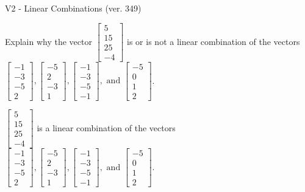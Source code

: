 \begin{exercise}
  \begin{exerciseTitle}V2 - Linear Combinations (ver. 349)\end{exerciseTitle}
  \begin{exerciseStatement}
    Explain why the vector \(\left[\begin{array}{c}
5 \\
15 \\
25 \\
-4
\end{array}\right]\)  is or is not a linear 
	combination of the vectors \(\left[\begin{array}{c}
-1 \\
-3 \\
-5 \\
2
\end{array}\right] , \left[\begin{array}{c}
-5 \\
2 \\
-3 \\
1
\end{array}\right] , \left[\begin{array}{c}
-1 \\
-3 \\
-5 \\
-1
\end{array}\right] , \text{ and } \left[\begin{array}{c}
-5 \\
0 \\
1 \\
2
\end{array}\right]\).
	


  \end{exerciseStatement}
  \begin{exerciseAnswer}
   \(\left[\begin{array}{c}
5 \\
15 \\
25 \\
-4
\end{array}\right]\) 
  	 is  
	a linear combination of the vectors \(\left[\begin{array}{c}
-1 \\
-3 \\
-5 \\
2
\end{array}\right] , \left[\begin{array}{c}
-5 \\
2 \\
-3 \\
1
\end{array}\right] , \left[\begin{array}{c}
-1 \\
-3 \\
-5 \\
-1
\end{array}\right] , \text{ and } \left[\begin{array}{c}
-5 \\
0 \\
1 \\
2
\end{array}\right]\).


\end{exerciseAnswer}
\end{exercise}
